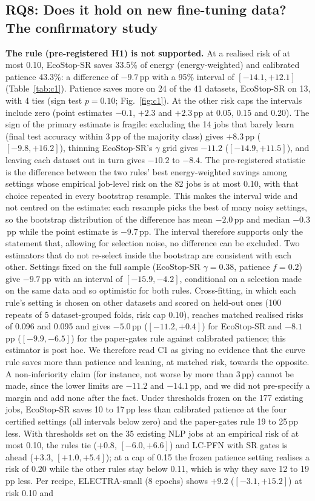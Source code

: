 \documentclass[3p,twocolumn,10pt]{elsarticle}
\theoremstyle{definition}
\begin{document}
\subsection{RQ8: Does it hold on new fine-tuning data? The confirmatory study}
\label{sec:c1}
\textbf{The rule (pre-registered H1) is not supported.} At a realised risk of at most 0.10, EcoStop-SR saves 33.5\% of energy (energy-weighted) and calibrated patience 43.3\%: a difference of $-9.7$\,pp with a 95\% interval of $[-14.1,+12.1]$ (Table~\ref{tab:c1}). Patience saves more on 24 of the 41 datasets, EcoStop-SR on 13, with 4 ties (sign test $p=0.10$; Fig.~\ref{fig:c1}). At the other risk caps the intervals include zero (point estimates $-0.1$, $+2.3$ and $+2.3$\,pp at 0.05, 0.15 and 0.20). The sign of the primary estimate is fragile: excluding the 14 jobs that barely learn (final test accuracy within 3\,pp of the majority class) gives $+8.3$\,pp ($[-9.8,+16.2]$), thinning EcoStop-SR's $\gamma$ grid gives $-11.2$ ($[-14.9,+11.5]$), and leaving each dataset out in turn gives $-10.2$ to $-8.4$. The pre-registered statistic is the difference between the two rules' best energy-weighted savings among settings whose empirical job-level risk on the 82 jobs is at most 0.10, with that choice repeated in every bootstrap resample. This makes the interval wide and not centred on the estimate: each resample picks the best of many noisy settings, so the bootstrap distribution of the difference has mean $-2.0$\,pp and median $-0.3$\,pp while the point estimate is $-9.7$\,pp. The interval therefore supports only the statement that, allowing for selection noise, no difference can be excluded. Two estimators that do not re-select inside the bootstrap are consistent with each other. Settings fixed on the full sample (EcoStop-SR $\gamma=0.38$, patience $f=0.2$) give $-9.7$\,pp with an interval of $[-15.9,-4.2]$, conditional on a selection made on the same data and so optimistic for both rules. Cross-fitting, in which each rule's setting is chosen on other datasets and scored on held-out ones (100 repeats of 5 dataset-grouped folds, risk cap 0.10), reaches matched realised risks of 0.096 and 0.095 and gives $-5.0$\,pp ($[-11.2,+0.4]$) for EcoStop-SR and $-8.1$\,pp ($[-9.9,-6.5]$) for the paper-gates rule against calibrated patience; this estimator is post hoc. We therefore read C1 as giving no evidence that the curve rule saves more than patience and leaning, at matched risk, towards the opposite. A non-inferiority claim (for instance, not worse by more than 3\,pp) cannot be made, since the lower limits are $-11.2$ and $-14.1$\,pp, and we did not pre-specify a margin and add none after the fact. Under thresholds frozen on the 177 existing jobs, EcoStop-SR saves 10 to 17\,pp less than calibrated patience at the four certified settings (all intervals below zero) and the paper-gates rule 19 to 25\,pp less. With thresholds set on the 35 existing NLP jobs at an empirical risk of at most 0.10, the rules tie ($+0.8$, $[-6.0,+6.6]$) and LC-PFN with SR gates is ahead ($+3.3$, $[+1.0,+5.4]$); at a cap of 0.15 the frozen patience setting realises a risk of 0.20 while the other rules stay below 0.11, which is why they save 12 to 19\,pp less. Per recipe, ELECTRA-small (8 epochs) shows $+9.2$ ($[-3.1,+15.2]$) at risk 0.10 and 
\end{document}
